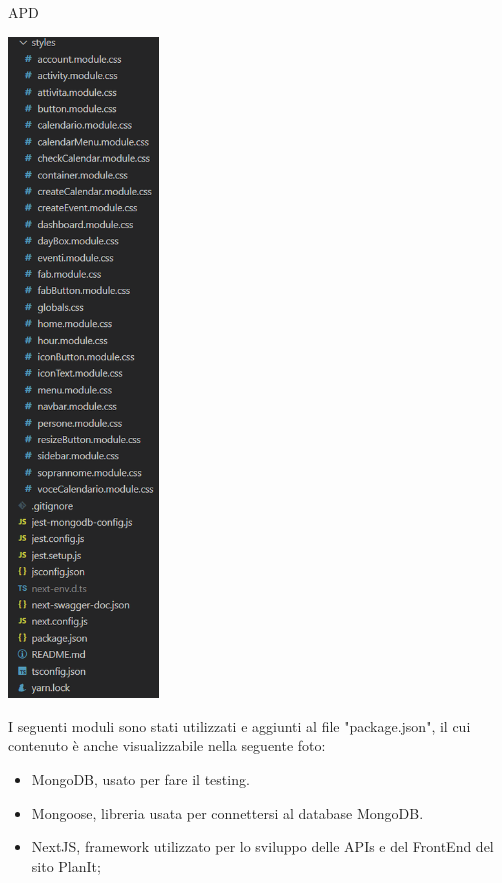 \begin{listaPersonale} {APD}
\begin{center}
        \includegraphics[width=0.3\textwidth, height=0.75\textheight]{img/png/project_structure/project_structure_totale_2.png}
    \end{center}
    \newpage
    I seguenti moduli sono stati utilizzati e aggiunti al file "package.json", il cui contenuto è anche visualizzabile nella seguente foto:
    \begin{itemize}
        \item MongoDB, usato per fare il testing.
        \item Mongoose, libreria usata per connettersi al database MongoDB.
        \item NextJS, framework utilizzato per lo sviluppo delle APIs e del FrontEnd del sito PlanIt;

\end{itemize}
\end{listaPersonale}
